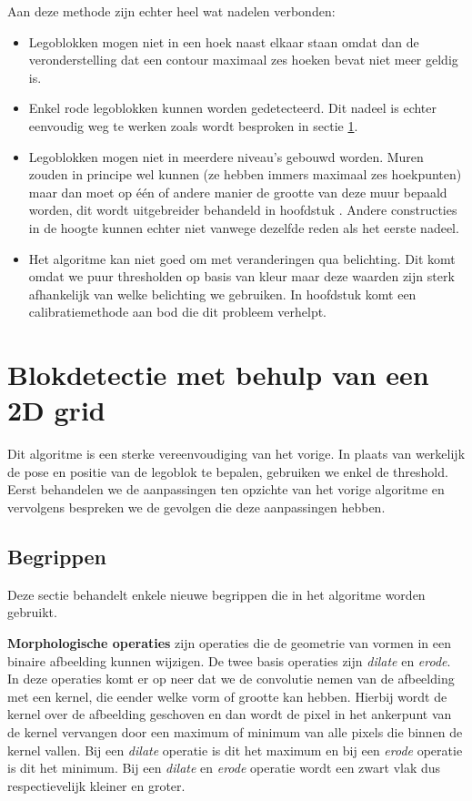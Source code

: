 Aan deze methode zijn echter heel wat nadelen verbonden:
\begin{itemize}
\item Legoblokken mogen niet in een hoek naast elkaar staan omdat dan de veronderstelling dat een contour maximaal zes hoeken bevat niet meer geldig is.
\item Enkel rode legoblokken kunnen worden gedetecteerd. Dit nadeel is echter eenvoudig weg te werken zoals wordt besproken in sectie \ref{sec:algo_grid}.
\item Legoblokken mogen niet in meerdere niveau's gebouwd worden. Muren zouden in principe wel kunnen (ze hebben immers maximaal zes hoekpunten) maar dan moet op \'e\'en of andere manier de grootte van deze muur bepaald worden, dit wordt uitgebreider behandeld in hoofdstuk \label{hoofdstuk:4}. Andere constructies in de hoogte kunnen echter niet vanwege dezelfde reden als het eerste nadeel.
\item Het algoritme kan niet goed om met veranderingen qua belichting. Dit komt omdat we puur thresholden op basis van kleur maar deze waarden zijn sterk afhankelijk van welke belichting we gebruiken. In hoofdstuk \label{hoofdstuk:4} komt een calibratiemethode aan bod die dit probleem verhelpt.
\end{itemize}
 
\section{Blokdetectie met behulp van een 2D grid} \label{sec:algo_grid}
Dit algoritme is een sterke vereenvoudiging van het vorige. In plaats van werkelijk de pose en positie van de legoblok te bepalen, gebruiken we enkel de threshold. Eerst behandelen we de aanpassingen ten opzichte van het vorige algoritme en vervolgens bespreken we de gevolgen die deze aanpassingen hebben.

\subsection{Begrippen}
Deze sectie behandelt enkele nieuwe begrippen die in het algoritme worden gebruikt.

\textbf{Morphologische operaties} zijn operaties die de geometrie van vormen in een binaire afbeelding kunnen wijzigen. De twee basis operaties zijn \textit{dilate} en \textit{erode}. In deze operaties komt er op neer dat we de convolutie nemen van de afbeelding met een kernel, die eender welke vorm of grootte kan hebben. Hierbij wordt de kernel over de afbeelding geschoven en dan wordt de pixel in het ankerpunt van de kernel vervangen door een maximum of minimum van alle pixels die binnen de kernel vallen. Bij een \textit{dilate} operatie is dit het maximum en bij een \textit{erode} operatie is dit het minimum. Bij een \textit{dilate} en \textit{erode} operatie wordt een zwart vlak dus respectievelijk kleiner en groter. 

